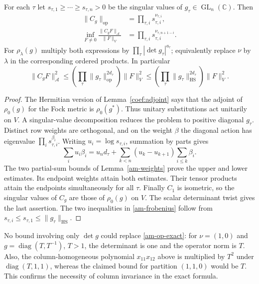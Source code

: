 \begin{theorem}\label{am-singular}
For each $\tau$ let
$s_{\tau,1}\ge\cdots\ge s_{\tau,n}>0$ be the singular values of
$g_\tau\in\operatorname{GL}_n(\mathbb C)$. Then
\begin{align}
 \|C_g\|_{\mathrm{op}}
       &=\prod_{\tau,i}s_{\tau,i}^{\nu_{\tau,i}},
       \label{am-op-exact}\\
 \inf_{F\ne0}\frac{\|C_gF\|_{\mathcal A}}{\|F\|_V}
       &=\prod_{\tau,i}s_{\tau,i}^{\nu_{\tau,n+1-i}}.
       \label{am-min-exact}
\end{align}
For $\rho_\lambda(g)$ multiply both expressions by
$\prod_\tau|\det g_\tau|^{a_\tau}$; equivalently replace $\nu$ by
$\lambda$ in the corresponding ordered products.
In particular
\begin{equation}\label{am-frobenius}
 \|C_gF\|_{\mathcal A}^2
 \le\left(\prod_\tau\|g_\tau\|_{\mathrm{op}}^{2d_\tau}\right)\|F\|_V^2
 \le\left(\prod_\tau\|g_\tau\|_{\mathrm{HS}}^{2d_\tau}\right)\|F\|_V^2.
\end{equation}
\end{theorem}
\begin{proof}
The Hermitian version of Lemma~\ref{coef:adjoint} says that the adjoint
of $\rho_0(g)$ for the Fock metric is $\rho_0(g^*)$.
Thus unitary substitutions act unitarily on $V$. A singular-value
decomposition reduces the problem to positive diagonal $g_\tau$.
Distinct row weights are orthogonal, and on the weight $\beta$ the
diagonal action has eigenvalue $\prod_i s_{\tau,i}^{\beta_i}$.
Writing $u_i=\log s_{\tau,i}$, summation by parts gives
\[
 \sum_i u_i\beta_i=u_nd_\tau
                   +\sum_{k<n}(u_k-u_{k+1})\sum_{i\le k}\beta_i.
\]
The two partial-sum bounds of Lemma~\ref{am-weights} prove the upper
and lower estimates. Its endpoint weights attain both estimates.
Their tensor products attain the endpoints simultaneously for all
$\tau$. Finally $C_1$ is isometric, so the singular values of $C_g$
are those of $\rho_0(g)$ on $V$. The scalar determinant twist gives
the last assertion. The two inequalities in \eqref{am-frobenius}
follow from $s_{\tau,i}\le s_{\tau,1}\le\|g_\tau\|_{\mathrm{HS}}$.
\end{proof}

No bound involving only $\det g$ could replace
\eqref{am-op-exact}: for $\nu=(1,0)$ and
$g=\operatorname{diag}(T,T^{-1})$, $T>1$, the determinant is one
and the operator norm is $T$. Also, the column-homogeneous polynomial
$x_{11}x_{12}$ above is multiplied by $T^2$ under
$\operatorname{diag}(T,1,1)$, whereas the claimed bound for partition
$(1,1,0)$ would be $T$. This confirms the necessity of column
invariance in the exact formula.

